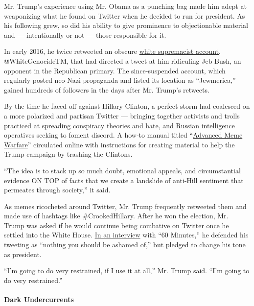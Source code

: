 Mr. Trump's experience using Mr. Obama as a punching bag made him adept
at weaponizing what he found on Twitter when he decided to run for
president. As his following grew, so did his ability to give prominence
to objectionable material and --- intentionally or not --- those
responsible for it.

In early 2016, he twice retweeted an obscure
\href{https://www.cnn.com/2016/01/22/politics/donald-trump-retweet-white-genocide/index.html}{white
supremacist account,} @WhiteGenocideTM, that had directed a tweet at him
ridiculing Jeb Bush, an opponent in the Republican primary. The
since-suspended account, which regularly posted neo-Nazi propaganda and
listed its location as ``Jewmerica,'' gained hundreds of followers in
the days after Mr. Trump's retweets.

By the time he faced off against Hillary Clinton, a perfect storm had
coalesced on a more polarized and partisan Twitter --- bringing together
activists and trolls practiced at spreading conspiracy theories and
hate, and Russian intelligence operatives seeking to foment discord. A
how-to manual titled
``\href{https://medium.com/@erin_gallagher/advanced-meme-warfare-july-6-2016-cw-5f9287ef36cd}{Advanced
Meme Warfare}'' circulated online with instructions for creating
material to help the Trump campaign by trashing the Clintons.

``The idea is to stack up so much doubt, emotional appeals, and
circumstantial evidence ON TOP of facts that we create a landslide of
anti-Hill sentiment that permeates through society,'' it said.

As memes ricocheted around Twitter, Mr. Trump frequently retweeted them
and made use of hashtags like \#CrookedHillary. After he won the
election, Mr. Trump was asked if he would continue being combative on
Twitter once he settled into the White House.
\href{https://www.cbsnews.com/news/60-minutes-donald-trump-family-melania-ivanka-lesley-stahl/}{In
an interview} with ``60 Minutes,'' he defended his tweeting as ``nothing
you should be ashamed of,'' but pledged to change his tone as president.

``I'm going to do very restrained, if I use it at all,'' Mr. Trump said.
``I'm going to do very restrained.''

\hypertarget{dark-undercurrents}{%
\paragraph{Dark Undercurrents}\label{dark-undercurrents}}

